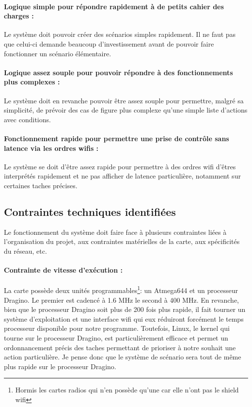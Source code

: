 \paragraph{Logique simple pour répondre rapidement à de petits cahier des charges :}
Le système doit pouvoir créer des scénarios simples rapidement. Il ne faut pas que celui-ci demande beaucoup d'investissement avant de pouvoir faire fonctionner un scénario élémentaire.
\paragraph{Logique assez souple pour pouvoir répondre à des fonctionnements plus complexes :}
Le système doit en revanche pouvoir être assez souple pour permettre, malgré sa simplicité, de prévoir des cas de figure plus complexe qu'une simple liste d'actions avec conditions.
\paragraph{Fonctionnement rapide pour permettre une prise de contrôle sans latence via les ordres wifis :}
Le système se doit d'être assez rapide pour permettre à des ordres wifi d'êtres interprétés rapidement et ne pas afficher de latence particulière, notamment sur certaines taches précises.

\subsection{Contraintes techniques identifiées}
Le fonctionnement du système doit faire face à plusieurs contraintes liées à l'organisation du projet, aux contraintes matérielles de la carte, aux spécificités du réseau, etc.
\paragraph{Contrainte de vitesse d'exécution :}
La carte possède deux unités programmables\footnote{Hormis les cartes radios qui n'en possède qu'une car elle n'ont pas le shield wifi}: un Atmega644 et un processeur Dragino. Le premier est cadencé à 1.6 MHz le second à 400 MHz. En revanche, bien que le processeur Dragino soit plus de 200 fois plus rapide, il fait tourner un système d'exploitation et une interface wifi qui eux réduiront forcément le temps processeur disponible pour notre programme. Toutefois, Linux, le kernel qui tourne sur le processeur Dragino, est particulièrement efficace et permet un ordonnancement précis des taches permettant de prioriser à notre souhait une action particulière. Je pense donc que le système de scénario sera tout de même plus rapide sur le processeur Dragino.
